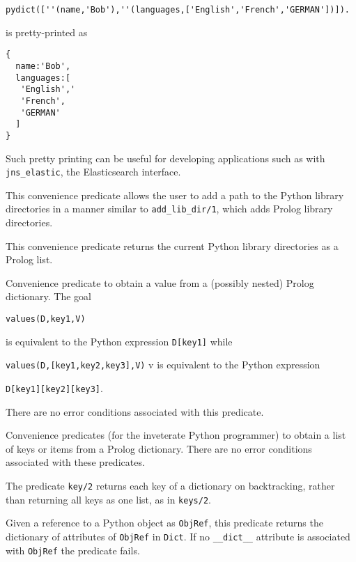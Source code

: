 \begin{description}
\begin{verbatim}
pydict([''(name,'Bob'),''(languages,['English','French','GERMAN'])]).
\end{verbatim}

\noindent
is pretty-printed as 
\begin{verbatim}
{
  name:'Bob',
  languages:[
   'English','
   'French',
   'GERMAN'
  ]
} 
\end{verbatim}

Such pretty printing can be useful for developing applications such as
with {\tt jns\_elastic}, the \janus{} Elasticsearch interface.

%
This convenience predicate allows the user to add a path to the Python
library directories in a manner similar to {\tt add\_lib\_dir/1},
which adds Prolog library directories.

%
This convenience predicate returns the current Python library
directories as a Prolog list.

%
  Convenience predicate to obtain a value from a (possibly nested)
  Prolog dictionary.  The goal

  {\tt values(D,key1,V)}

\noindent
  is equivalent to the
  Python expression {\tt D[key1]} while

  {\tt values(D,[key1,key2,key3],V)}
v
\noindent
is equivalent to the Python expression

{\tt D[key1][key2][key3]}.

There are no error conditions associated with this predicate.

%
Convenience predicates (for the inveterate Python programmer) to
obtain a list of keys or items from a Prolog dictionary.  There are no
error conditions associated with these predicates.

The predicate {\tt key/2} returns each key of a dictionary on
backtracking, rather than returning all keys as one list, as in {\tt keys/2}.

%
Given a reference to a Python object as {\tt ObjRef}, this predicate
returns the dictionary of attributes of {\tt ObjRef} in {\tt Dict}.
If no {\tt \_\_dict\_\_} attribute is associated with {\tt ObjRef} the
predicate fails.


\end{description}
